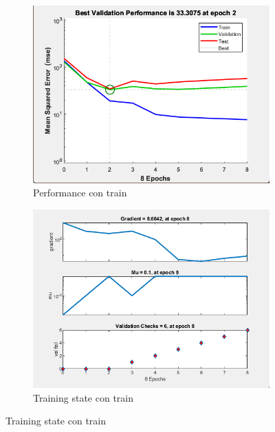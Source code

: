 \documentclass[a4paper, 12pt]{article}
\begin{document}
                \begin{figure}[htp!]
                    \caption{Gráficas con Backpropagation}
                    \begin{subfigure}{0.49\textwidth}
                        \centering
        		      \includegraphics[width=\textwidth]{figures/parte1/Ej3/Ej3_performance_train.png}
                        \caption{Performance con train}
                    \end{subfigure}
                    \begin{subfigure}{0.49\textwidth}
                        \includegraphics[width=\textwidth]{figures/parte1/Ej3/Ej3_training_state_train.png}
                        \caption{Training state con train}

\end{subfigure}
\end{figure}
\end{document}
